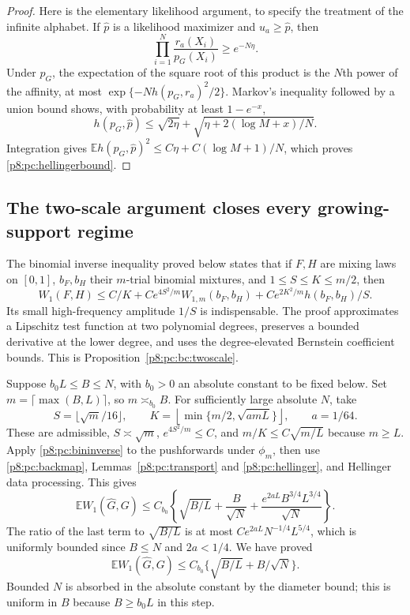 \documentclass[11pt,a4paper]{article}
\theoremstyle{definition}
\theoremstyle{remark}
\numberwithin{equation}{section}
\begin{document}
\begin{proof}
Here is the elementary likelihood argument, to specify the treatment
of the infinite alphabet.  If $\widehat p$ is a likelihood maximizer
and $u_a\ge\widehat p$, then
\[
 \prod_{i=1}^N\frac{r_a(X_i)}{p_G(X_i)}\ge e^{-N\eta}.
\]
Under $p_G$, the expectation of the square root of this product is
the $N$th power of the affinity, at most
$\exp\{-Nh(p_G,r_a)^2/2\}$.  Markov's inequality followed by a
union bound shows, with probability at least $1-e^{-x}$,
\[
 h(p_G,\widehat p)\le\sqrt{2\eta}
       +\sqrt{\eta+2(\log M+x)/N}.
\]
Integration gives
$\mathbb E h(p_G,\widehat p)^2\le C\eta+C(\log M+1)/N$,
which proves \eqref{p8:pc:hellingerbound}.
\end{proof}

\subsection{The two-scale argument closes every growing-support regime}

The binomial inverse inequality proved below states that if $F,H$ are
mixing laws on $[0,1]$, $b_F,b_H$ their $m$-trial binomial mixtures,
and $1\le S\le K\le m/2$, then
\begin{equation}\label{p8:pc:bininverse}
 W_1(F,H)\le C/K+Ce^{4S^2/m}W_{1,m}(b_F,b_H)
                      +Ce^{2K^2/m}h(b_F,b_H)/S.
\end{equation}
Its small high-frequency amplitude $1/S$ is indispensable.
The proof approximates a Lipschitz test function at two polynomial
degrees, preserves a bounded derivative at the lower degree, and
uses the degree-elevated Bernstein coefficient bounds.  This is
Proposition~\ref{p8:pc:bc:twoscale}.

Suppose $b_0L\le B\le N$, with $b_0>0$ an absolute constant to
be fixed below.  Set $m=\lceil\max(B,L)\rceil$, so $m\asymp_{b_0}B$.
For sufficiently large absolute $N$, take
\[
 S=\lfloor\sqrt m/16\rfloor,\qquad
 K=\left\lfloor\min\{m/2,\sqrt{a mL}\}\right\rfloor,
 \qquad a=1/64.
\]
These are admissible, $S\asymp\sqrt m$, $e^{4S^2/m}\le C$, and
$m/K\le C\sqrt{m/L}$ because $m\ge L$.
Apply \eqref{p8:pc:bininverse} to the pushforwards under $\phi_m$,
then use \eqref{p8:pc:backmap}, Lemmas~\ref{p8:pc:transport} and
\ref{p8:pc:hellinger}, and Hellinger data processing.  This gives
\[
 \mathbb E W_1(\widehat G,G)
 \le C_{b_0}\left\{
 \sqrt{B/L}+\frac B{\sqrt N}
       +\frac{e^{2aL}B^{3/4}L^{3/4}}{\sqrt N}\right\}.
\]
The ratio of the last term to $\sqrt{B/L}$ is at most
$C e^{2aL}N^{-1/4}L^{5/4}$, which is uniformly bounded since
$B\le N$ and $2a<1/4$.  We have proved
\begin{equation}\label{p8:pc:medium}
 \mathbb E W_1(\widehat G,G)
                  \le C_{b_0}\{\sqrt{B/L}+B/\sqrt N\}.
\end{equation}
Bounded $N$ is absorbed in the absolute constant by the diameter
bound; this is uniform in $B$ because $B\ge b_0L$ in this step.
\end{document}
